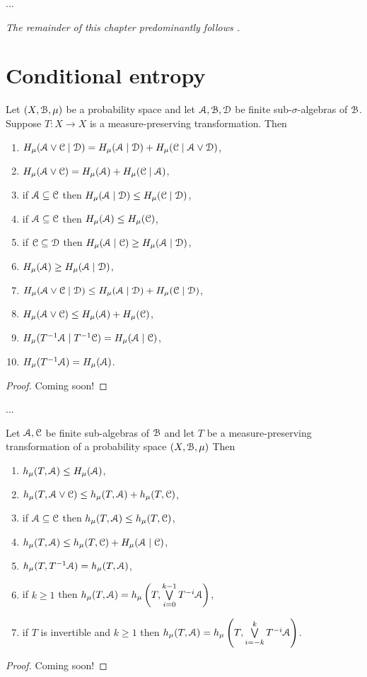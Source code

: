 ...

\emph{The remainder of this chapter predominantly follows \cite[Chapter 4]{walters:intro-to-ergodic-theory}.}

\section{Conditional entropy}
\begin{theorem}\label{thm:walters-4.3}
	Let $(X, \mathcal{B}, \mu)$ be a probability space and let $\mathcal{A}, \mathcal{B}, \mathcal{D}$ be finite sub-$\sigma$-algebras of $\mathcal{B}$. Suppose $T : X \to X$ is a measure-preserving transformation. Then
	\begin{enumerate}
		\item $H_\mu(\mathcal{A} \vee \mathcal{C} \mid \mathcal{D}) = H_\mu(\mathcal{A} \mid \mathcal{D}) + H_\mu(\mathcal{C} \mid \mathcal{A} \vee \mathcal{D})$,
		\item $H_\mu(\mathcal{A} \vee \mathcal{C}) = H_\mu(\mathcal{A}) + H_\mu(\mathcal{C} \mid \mathcal{A})$,
		\item if $\mathcal{A} \subseteq \mathcal{C}$  then $H_\mu(\mathcal{A} \mid \mathcal{D}) \leq H_\mu(\mathcal{C} \mid \mathcal{D})$,
		\item if $\mathcal{A} \subseteq \mathcal{C}$  then $H_\mu(\mathcal{A}) \leq H_\mu(\mathcal{C})$,
		\item if $\mathcal{C} \subseteq \mathcal{D}$ then $H_\mu(\mathcal{A} \mid \mathcal{C}) \geq H_\mu(\mathcal{A} \mid \mathcal{D})$,
		\item $H_\mu(\mathcal{A}) \geq H_\mu(\mathcal{A} \mid \mathcal{D})$,
		\item $H_\mu(\mathcal{A} \vee \mathcal{C} \mid \mathcal{D}) \leq H_\mu(\mathcal{A} \mid \mathcal{D}) + H_\mu(\mathcal{C} \mid \mathcal{D})$,
		\item $H_\mu(\mathcal{A} \vee \mathcal{C}) \leq H_\mu(\mathcal{A}) + H_\mu(\mathcal{C})$,
		\item $H_\mu(T^{-1}\mathcal{A} \mid T^{-1}\mathcal{C}) = H_\mu(\mathcal{A} \mid \mathcal{C})$,
		\item $H_\mu(T^{-1}\mathcal{A}) = H_\mu(\mathcal{A})$.
	\end{enumerate}
	\begin{proof}
		Coming soon!
	\end{proof}
\end{theorem}

...

\begin{theorem}\label{thm:walters-4.12}
	Let $\mathcal{A}, \mathcal{C}$ be finite sub-algebras of $\mathcal{B}$ and let $T$ be a measure-preserving transformation of a probability space $(X, \mathcal{B}, \mu)$ Then
	\begin{enumerate}
		\item $h_\mu(T, \mathcal{A}) \leq H_\mu(\mathcal{A})$,
		\item $h_\mu(T, \mathcal{A} \vee \mathcal{C}) \leq h_\mu(T, \mathcal{A}) + h_\mu(T, \mathcal{C})$,
		\item if $\mathcal{A} \subseteq \mathcal{C}$ then $h_\mu(T, \mathcal{A}) \leq h_\mu(T, \mathcal{C})$,
		\item $h_\mu(T, \mathcal{A}) \leq h_\mu(T, \mathcal{C}) + H_\mu(\mathcal{A} \mid \mathcal{C})$,
		\item $h_\mu(T, T^{-1}{\mathcal{A}}) = h_\mu(T, \mathcal{A})$,
		\item if $k \geq 1$ then $h_\mu(T, \mathcal{A}) = h_\mu\left(T, \bigvee\limits_{i = 0}^{k - 1}{T^{-i}{\mathcal{A}}}\right)$,
		\item if $T$ is invertible and $k \geq 1$ then $h_\mu(T, \mathcal{A}) = h_\mu\left(T, \bigvee\limits_{i = -k}^k{T^{-i}{\mathcal{A}}}\right)$.
	\end{enumerate}
	\begin{proof}
		Coming soon!
	\end{proof}
\end{theorem}
